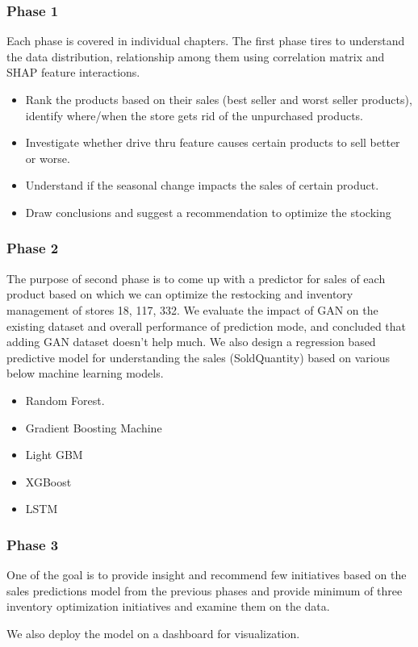 \subsubsection{Phase 1}
Each phase is covered in individual chapters. The first phase tires to understand the data distribution, relationship among them using correlation matrix and SHAP feature interactions. 
\begin{itemize}
    \item Rank the products based on their sales (best seller and worst seller products), identify where/when the store gets rid of the unpurchased products.
    \item Investigate whether drive thru feature causes certain products to sell better or worse.
    \item Understand if the seasonal change impacts the sales of certain product.
    \item Draw conclusions and suggest a recommendation to optimize the stocking
\end{itemize}

\subsubsection{Phase 2}
The purpose of second phase is to come up with a predictor for sales of each product based on which we can optimize the restocking and inventory management of stores 18, 117, 332. We evaluate the impact of GAN on the existing dataset and overall performance of prediction mode, and concluded that adding GAN dataset doesn't help much. We also design a regression based predictive model for understanding the sales (SoldQuantity) based on various below machine learning models. 
\begin{itemize}
    \item Random Forest.
    \item Gradient Boosting Machine
    \item Light GBM
    \item XGBoost
    \item LSTM
\end{itemize}

\subsubsection{Phase 3}
One of the goal is to provide insight and recommend few initiatives based on the sales predictions model from the previous phases and provide minimum of three inventory optimization initiatives and examine them on the data.

We also deploy the model on a dashboard for visualization. 


